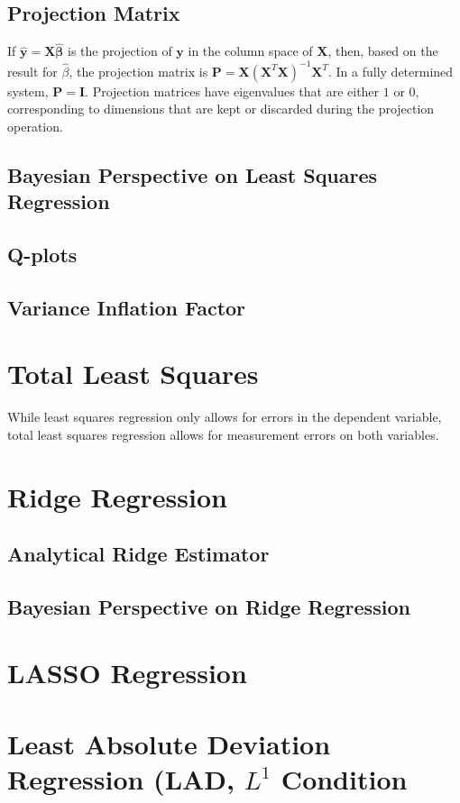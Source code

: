 \subsection{Projection Matrix}

If $\mathbf{\hat{y}}=\mathbf{X}\mathbf{\hat{\beta}}$ is the projection of $\mathbf{y}$ in the column space of $\mathbf{X}$, then, based on the result for $\hat{\beta}$, the projection matrix is $\mathbf{P} = \mathbf{X}\left(\mathbf{X}^T\mathbf{X}\right)^{-1}\mathbf{X}^T$. In a fully determined system, $\mathbf{P}=\mathbf{I}$. Projection matrices have eigenvalues that are either $1$ or $0$, corresponding to dimensions that are kept or discarded during the projection operation.


\subsection{Bayesian Perspective on Least Squares Regression}




\subsection{Q-plots}
\subsection{Variance Inflation Factor}

\section{Total Least Squares}
While least squares regression only allows for errors in the dependent variable, total least squares regression allows for measurement errors on both variables.

\section{Ridge Regression}
\subsection{Analytical Ridge Estimator}
\subsection{Bayesian Perspective on Ridge Regression}

\section{LASSO Regression}

\section{Least Absolute Deviation Regression (LAD, $L^1$ Condition}

\chapauthor{}

